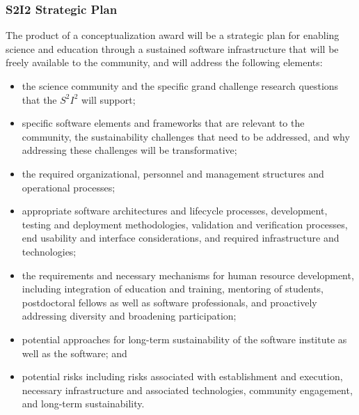 \begin{frame}
\frametitle{S2I2 Strategic Plan}

{\scriptsize
\noindent The product of a conceptualization award will be a strategic plan for enabling science and education through a sustained software infrastructure that will be freely available to the community, and will address the following elements:

\begin{itemize}
\item the science community and the specific grand challenge research questions that the $S^2 I^2$ will support;
\item {\color{blue} specific software elements and frameworks that are relevant to the community, the sustainability challenges that need to be addressed, and why addressing these challenges will be transformative;}
\item {\color{blue} the required organizational, personnel and management structures and operational processes;}
\item {\color{blue} appropriate software architectures and lifecycle processes, development, testing and deployment methodologies, validation and verification processes, end usability and interface considerations, and required infrastructure and technologies;}
\item the requirements and necessary mechanisms for human resource development, including integration of education and training, mentoring of students, postdoctoral fellows as well as software professionals, and proactively addressing diversity and broadening participation;
\item potential approaches for long-term sustainability of the software institute as well as the software; and
\item potential risks including risks associated with establishment and execution, necessary infrastructure and associated technologies, community engagement, and long-term sustainability.
\end{itemize}
}

\end{frame}


